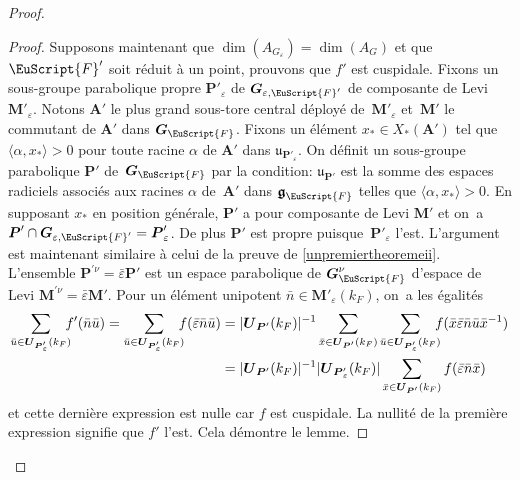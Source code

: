\documentclass[JEP,XML,SOM,Unicode,francais]{cedram}
\let\mathcal \EuScript
\let\epsilon\varepsilon
\let\<\langle
\let\>\rangle
\newcommand{\frg}{\mathfrak{g}}
\newcommand{\fru}{\mathfrak{u}}
\newcommand{\bA}{\boldsymbol{A}}
\newcommand{\bG}{\boldsymbol{G}}
\newcommand{\bM}{\boldsymbol{M}}
\newcommand{\bP}{\boldsymbol{P}}
\newcommand{\bU}{\boldsymbol{U}}
\newcommand{\cF}{\mathcal{F}}
\theoremstyle{plain}
\theoremstyle{definition}
\begin{document}
\begin{proof}
\begin{proof}
Supposons maintenant que $\dim(A_{G_{\epsilon}})=\dim(A_{G})$ et que $\cF'$ soit réduit à un point, prouvons que $f'$ est cuspidale. Fixons un sous-groupe parabolique propre $\bP'_{\epsilon}$ de $\bG_{\epsilon,\cF'}$ de composante de Levi $\bM'_{\epsilon}$. Notons $\bA'$ le plus grand sous-tore central déployé de~$\bM'_{\epsilon}$ et~$\bM'$ le commutant de $\bA'$ dans $\bG_{\cF}$. Fixons un élément $x_{*}\in X_{*}(\bA')$ tel que \hbox{$\<\alpha,x_{*}\>\!>\!0$} pour toute racine $\alpha$ de $\bA'$ dans $\boldsymbol{\fru}_{\bP'_{\epsilon}}$. On définit un sous-groupe parabolique $\bP'$ de~$\bG_{\cF}$ par la condition: $\boldsymbol{\fru}_{\bP'}$ est la somme des espaces radiciels associés aux racines $\alpha$ de~$\bA'$ dans $\boldsymbol{\frg}_{\cF}$ telles que $\<\alpha,x_{*}\>>0$. En supposant $x_{*}$ en position générale, $\bP'$ a pour composante de Levi $\bM'$ et on~a $\bP'\cap \bG_{\epsilon,\cF'}=\bP'_{\epsilon}$. De plus $\bP'$ est propre puisque~$\bP'_{\epsilon}$ l'est. L'argument est maintenant similaire à celui de la preuve de \eqref{unpremiertheoremeii}. L'ensemble $\bP^{\prime\nu}=\bar{\epsilon}\bP'$ est un espace parabolique de $\bG_{\cF}^{\nu}$ d'espace de Levi $\bM^{\prime\nu}=\bar{\epsilon}\bM'$. Pour un élément unipotent $\bar{n}\in \bM'_{\epsilon}(k_{F})$, on~a les égalités\vspace*{-3pt}
\begin{align*}
\sum_{\bar{u}\in \bU_{\bP'_{\epsilon}}(k_{F})}\hspace*{-2mm}f'(\bar{n}\bar{u})=\sum_{\bar{u}\in \bU_{\bP'_{\epsilon}}(k_{F})}\hspace*{-2mm}f(\bar{\epsilon}\bar{n}\bar{u})
&=\vert \bU_{\bP'}(k_{F})\vert ^{-1}\sum_{\bar{x}\in \bU_{\bP'}(k_{F})}\sum_{\bar{u}\in \bU_{\bP'_{\epsilon}}(k_{F})}\hspace*{-2mm}f(\bar{x}\bar{\epsilon}\bar{n}\bar{u}\bar{x}^{-1})\\
&=\vert \bU_{\bP'}(k_{F})\vert ^{-1}\vert \bU_{\bP'_{\epsilon}}(k_{F})\vert \sum_{\bar{x}\in \bU_{\bP'}(k_{F})}f(\bar{\epsilon}\bar{n}\bar{x})
\end{align*}
et cette dernière expression est nulle car $f$ est cuspidale. La nullité de la première expression signifie que $f'$ l'est. Cela démontre le lemme.
\end{proof}


\end{proof}
\end{document}
